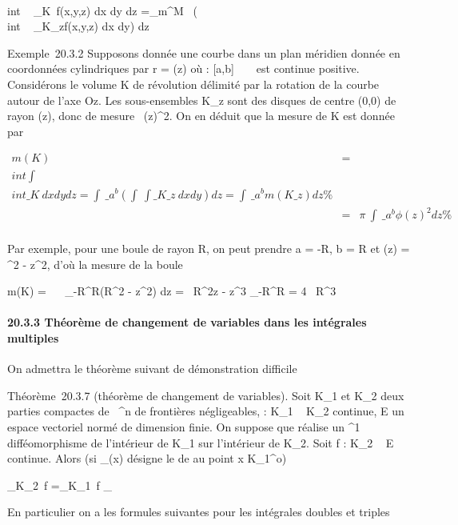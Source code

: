 \documentclass[]{article}
\begin{document}
\int  \\int ~
\int  \_K~f(x,y,z) dx dy dz
=\int  \_m^M~\left
(\int  \\int ~
\_K\_zf(x,y,z) dx dy\right ) dz

Exemple~20.3.2 Supposons donnée une courbe dans un plan méridien donnée
en coordonnées cylindriques par r = \phi(z) où \phi : {[}a,b{]} \rightarrow~ ~ est
continue positive. Considérons le volume K de révolution délimité par la
rotation de la courbe autour de l'axe Oz. Les sous-ensembles
K\_z sont des disques de centre (0,0) de rayon \phi(z), donc de
mesure \pi~\phi(z)^2. On en déduit que la mesure de K est donnée
par

\begin{align*} m(K)& =& \\int
 \int  \\int  \_K~
dx dy dz =\int ~
\_a^b\left (\int ~
\int  \_K\_z~ dx
dy\right ) dz =\int ~
\_a^bm(K\_ z) dz\%&
\\ & =& \pi~\int ~
\_a^b\phi(z)^2 dz \%&
\\ \end{align*}

Par exemple, pour une boule de rayon R, on peut prendre a = -R, b = R et
\phi(z) = \sqrtR^2  - z^2, d'où la
mesure de la boule

m(K) = \pi~\int ~
\_-R^R(R^2 - z^2) dz =
\pi~\left {[}R^2z - z^3
 \right {]}\_-R^R
= 4  \pi~R^3

\paragraph{20.3.3 Théorème de changement de variables dans les
intégrales multiples}

On admettra le théorème suivant de démonstration difficile

Théorème~20.3.7 (théorème de changement de variables). Soit K\_1
et K\_2 deux parties compactes de ~^n de frontières
négligeables, \phi : K\_1 \rightarrow~ K\_2 continue, E un espace
vectoriel normé de dimension finie. On suppose que \phi réalise un
^1 difféomorphisme de l'intérieur de K\_1 sur
l'intérieur de K\_2. Soit f : K\_2 \rightarrow~ E continue. Alors
(si \jmath\_\phi(x) désigne le \jmathacobien de \phi au point x \in
K\_1^o)

\int  \_K\_2~f
=\int  \_K\_1~f \cdot \phi
\textbar{}\jmath\_\phi\textbar{}

En particulier on a les formules suivantes pour les intégrales doubles
et triples
\end{document}
